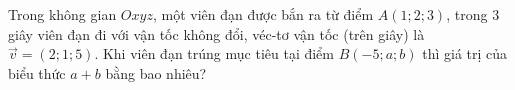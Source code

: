 \begin{bt}%
	Trong không gian $Oxyz$, một viên đạn được bắn ra từ điểm $A(1; 2; 3)$, trong $3\,$giây viên đạn đi với vận tốc không đổi, véc-tơ vận tốc (trên giây) là $\vec{v} = (2; 1; 5)$. Khi viên đạn trúng mục tiêu tại điểm $B(-5; a; b)$ thì giá trị của biểu thức $a + b$ bằng bao nhiêu?
\end{bt}

